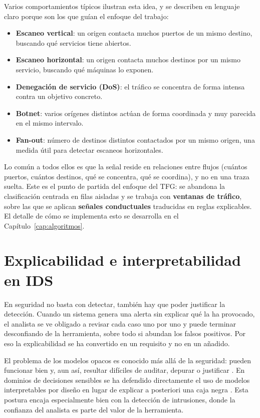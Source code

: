 Varios comportamientos típicos ilustran esta idea, y se describen en lenguaje claro porque son los que guían el enfoque del trabajo:

\begin{itemize}
  \item \textbf{Escaneo vertical}: un origen contacta muchos puertos de un mismo destino, buscando qué servicios tiene abiertos.
  \item \textbf{Escaneo horizontal}: un origen contacta muchos destinos por un mismo servicio, buscando qué máquinas lo exponen.
  \item \textbf{Denegación de servicio (DoS)}: el tráfico se concentra de forma intensa contra un objetivo concreto.
  \item \textbf{Botnet}: varios orígenes distintos actúan de forma coordinada y muy parecida en el mismo intervalo.
  \item \textbf{Fan-out}: número de destinos distintos contactados por un mismo origen, una medida útil para detectar escaneos horizontales.
\end{itemize}

Lo común a todos ellos es que la señal reside en relaciones entre flujos (cuántos puertos, cuántos destinos, qué se concentra, qué se coordina), y no en una traza suelta. Este es el punto de partida del enfoque del TFG: se abandona la clasificación centrada en filas aisladas y se trabaja con \textbf{ventanas de tráfico}, sobre las que se aplican \textbf{señales conductuales} traducidas en reglas explicables. El detalle de cómo se implementa esto se desarrolla en el Capítulo~\ref{cap:algoritmos}.

\section{Explicabilidad e interpretabilidad en IDS}
\label{sec:arte_explicabilidad}

En seguridad no basta con detectar, también hay que poder justificar la detección. Cuando un sistema genera una alerta sin explicar qué la ha provocado, el analista se ve obligado a revisar cada caso uno por uno y puede terminar desconfiando de la herramienta, sobre todo si abundan los falsos positivos. Por eso la explicabilidad se ha convertido en un requisito y no en un añadido.

El problema de los modelos opacos es conocido más allá de la seguridad: pueden funcionar bien y, aun así, resultar difíciles de auditar, depurar o justificar \cite{guidotti2018survey}. En dominios de decisiones sensibles se ha defendido directamente el uso de modelos interpretables por diseño en lugar de explicar a posteriori una caja negra \cite{rudin2019stop}. Esta postura encaja especialmente bien con la detección de intrusiones, donde la confianza del analista es parte del valor de la herramienta.


